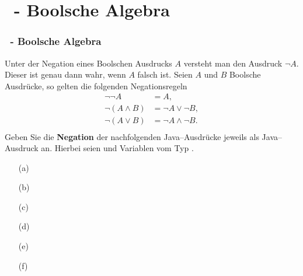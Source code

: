 \def\stitle{\theexercise\ - Boolsche Algebra}
\section{\stitle}
\begin{frame}[t]%
  \frametitle{\stitle}
\medskip

Unter der Negation eines Boolschen Ausdrucks $A$ versteht man den Ausdruck $\neg A$. Dieser ist genau dann wahr, wenn $A$ falsch ist. Seien $A$ und $B$ Boolsche Ausdrücke, so gelten die folgenden Negationsregeln
\begin{align*}
\neg \neg A &= A,\\
\neg (A \wedge B) &= \neg A \vee \neg B,\\
\neg (A \vee B)   &= \neg A \wedge \neg B. \\
\end{align*}
Geben Sie die \textbf{Negation} der nachfolgenden Java--Ausdrücke jeweils als Java--Ausdruck an. Hierbei seien  und  Variablen vom Typ .\\[1em]
\begin{center}
\begin{minipage}{0.35\textwidth}
\begin{itemize}
\item[(a)] 
\item[(b)] 
\item[(c)] 
\end{itemize}
\end{minipage}
\quad
\begin{minipage}{0.6\textwidth}
\begin{itemize}
\item[(d)] 
\item[(e)] 
\item[(f)] 
\end{itemize}
\end{minipage}
\end{center}

\end{frame}
